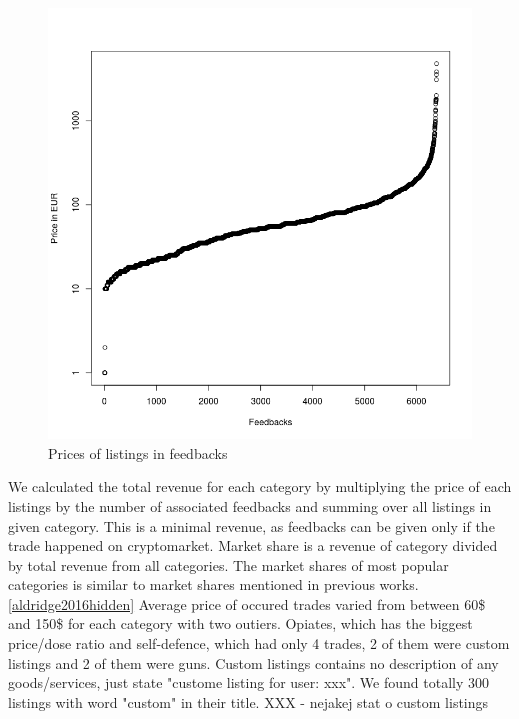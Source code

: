 \documentclass[
  digital, %
  table,   %
  lof,     %
  lot,     %
  oneside
]{fithesis3}
\begin{document}
\begin{figure}[!htb]
    \centering
    \includegraphics[scale=0.4]{flistingxprice}
    \caption{Prices of listings in feedbacks}
    \label{flistingxprice}
\end{figure}

We calculated the total revenue for each category
by multiplying the price of each listings by the number of associated feedbacks
and summing over all listings in given category. This is a minimal revenue, as feedbacks
can be given only if the trade happened on cryptomarket.
Market share is a revenue of category divided by total revenue from all categories.
The market shares of most popular categories is similar
to market shares mentioned in previous works.\ref{aldridge2016hidden}
Average price of occured trades varied from between 60\$ and 150\$ for each category
with two outiers. Opiates, which has the biggest price/dose ratio and 
self-defence, which had only 4 trades, 2 of them were custom listings and 2 of them were guns.
Custom listings contains no description of any goods/services, just state "custome listing for user: xxx".
We found totally 300 listings with word "custom" in their title. XXX - nejakej stat o custom listings
\end{document}
